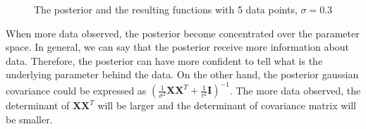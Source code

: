 \documentclass[12pt]{article}
\newenvironment{question}[2][Question]{\begin{trivlist}
\kern10pt
\item[\hskip \labelsep {\bfseries #1}\hskip \labelsep {\bfseries #2.}]}{\end{trivlist}}
\begin{document}
\begin{question}{9}
\begin{figure}[h!]
  \hfill
  \caption{The posterior and the resulting functions with 5 data points, $\sigma = 0.3$}
\end{figure}

When more data observed, the posterior become concentrated over the parameter space.
In general, we can say that the posterior receive more information about data.
Therefore, the posterior can have more confident to tell what is the underlying 
parameter behind the data. On the other hand, the posterior gaussian covariance
could be expressed as 
$(\frac{1}{\sigma^2}\mathbf{X}\mathbf{X}^T + \frac{1}{\tau^2}\mathbf{I})^{-1}$.
The more data observed, the determinant of $\mathbf{X}\mathbf{X}^T$ will be 
larger and the determinant of covariance matrix will be smaller.


\end{question}
\end{document}
